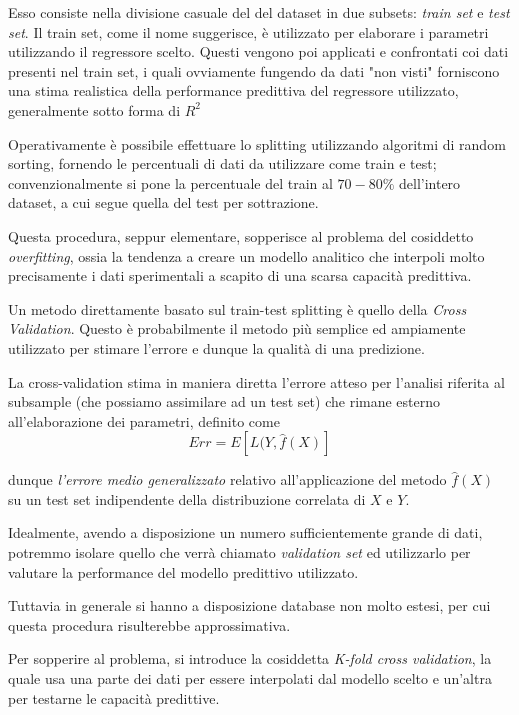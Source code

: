 \documentclass[12pt,openright,twoside,a4paper]{book}
\begin{document}
Esso consiste nella divisione casuale del del dataset in due subsets: \textit{train set} e \textit{test set}.
Il train set, come il nome suggerisce, è utilizzato per elaborare i parametri utilizzando il regressore scelto.
Questi vengono poi applicati e confrontati coi dati presenti nel train set, i quali ovviamente fungendo da dati "non visti" forniscono una stima realistica della performance predittiva del regressore utilizzato, generalmente sotto forma di $R^2$

Operativamente è possibile effettuare lo splitting utilizzando algoritmi di random sorting, fornendo le percentuali di dati da utilizzare come train e test; convenzionalmente si pone la percentuale del train al $70-80\%$ dell'intero dataset, a cui segue quella del test per sottrazione.

Questa procedura, seppur elementare, sopperisce al problema del cosiddetto \textit{overfitting}, ossia la tendenza a creare un modello analitico che interpoli molto precisamente i dati sperimentali a scapito di una scarsa capacità predittiva.

Un metodo direttamente basato sul train-test splitting è quello della \textit{Cross Validation}.
Questo è probabilmente il metodo più semplice ed ampiamente utilizzato per stimare l'errore e dunque la qualità di una predizione.

La cross-validation stima in maniera diretta l'errore atteso per l'analisi riferita al subsample (che possiamo assimilare ad un test set) che rimane esterno all'elaborazione dei parametri, definito come
\begin{equation}
Err=E[L(Y,\hat{f}(X)]
\end{equation}

dunque \textit{l'errore medio generalizzato} relativo all'applicazione del metodo $\hat{f}(X)$ su un test set indipendente della distribuzione correlata di $X$ e $Y$.

Idealmente, avendo a disposizione un numero sufficientemente grande di dati, potremmo isolare quello che verrà chiamato \textit{validation set} ed utilizzarlo per valutare la performance del modello predittivo utilizzato.

Tuttavia in generale si hanno a disposizione database non molto estesi, per cui questa procedura risulterebbe approssimativa.

Per sopperire al problema, si introduce la cosiddetta \textit{K-fold cross validation}, la quale usa una parte dei dati per essere interpolati dal modello scelto e un'altra per testarne le capacità predittive.
\end{document}
